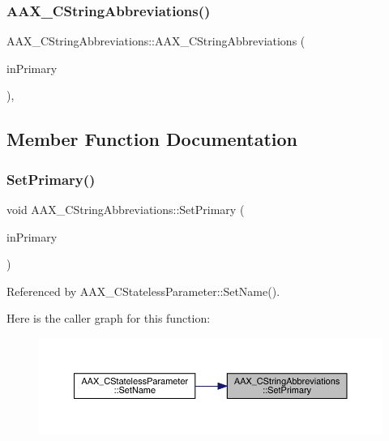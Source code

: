 \subsubsection{\texorpdfstring{AAX\_CStringAbbreviations()}{AAX\_CStringAbbreviations()}}
{\footnotesize\ttfamily A\+A\+X\+\_\+\+C\+String\+Abbreviations\+::\+A\+A\+X\+\_\+\+C\+String\+Abbreviations (\begin{DoxyParamCaption}\item[{const \mbox{\hyperlink{a01573}{A\+A\+X\+\_\+\+C\+String}} \&}]{in\+Primary }\end{DoxyParamCaption})\hspace{0.3cm}{\ttfamily [inline]}, {\ttfamily [explicit]}}



\subsection{Member Function Documentation}
\mbox{\label{a01577_adab8aa7dbc6c1cc8d9d4e8702a55f149}} 
\subsubsection{\texorpdfstring{SetPrimary()}{SetPrimary()}}
{\footnotesize\ttfamily void A\+A\+X\+\_\+\+C\+String\+Abbreviations\+::\+Set\+Primary (\begin{DoxyParamCaption}\item[{const \mbox{\hyperlink{a01573}{A\+A\+X\+\_\+\+C\+String}} \&}]{in\+Primary }\end{DoxyParamCaption})\hspace{0.3cm}{\ttfamily [inline]}}



Referenced by A\+A\+X\+\_\+\+C\+Stateless\+Parameter\+::\+Set\+Name().

Here is the caller graph for this function\+:
\nopagebreak
\begin{figure}[H]
\begin{center}
\leavevmode
\includegraphics[width=350pt]{a01577_adab8aa7dbc6c1cc8d9d4e8702a55f149_icgraph}
\end{center}
\end{figure}
\mbox{\label{a01577_acff0707d73249820d7863da3633b1bf9}} 
